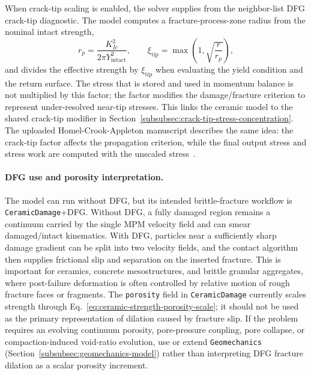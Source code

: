 When crack-tip scaling is enabled, the solver supplies  from the neighbor-list DFG crack-tip diagnostic.  The model computes a fracture-process-zone radius from the nominal intact strength,
\begin{equation}
  r_p = \frac{K_{Ic}^{2}}{2\pi Y_{\text{intact}}^{2}},
  \qquad
  \xi_{\mathrm{tip}} = \max\left(1,\sqrt{\frac{r}{r_p}}\right),
  \label{eq:ceramic-crack-tip-factor}
\end{equation}
and divides the effective strength by \(\xi_{\mathrm{tip}}\) when evaluating the yield condition and the return surface.  The stress that is stored and used in momentum balance is not multiplied by this factor; the factor modifies the damage/fracture criterion to represent under-resolved near-tip stresses.  This links the ceramic model to the shared crack-tip modifier in Section~\ref{subsubsec:crack-tip-stress-concentration}.  The uploaded Homel-Crook-Appleton manuscript describes the same idea: the crack-tip factor affects the propagation criterion, while the final output stress and stress work are computed with the unscaled stress~\cite{homelCrookAppleton2026sizeeffects}.

\paragraph{DFG use and porosity interpretation.}
The model can run without DFG, but its intended brittle-fracture workflow is \texttt{CeramicDamage}+DFG.  Without DFG, a fully damaged region remains a continuum carried by the single MPM velocity field and can smear damaged/intact kinematics.  With DFG, particles near a sufficiently sharp damage gradient can be split into two velocity fields, and the contact algorithm then supplies frictional slip and separation on the inserted fracture.  This is important for ceramics, concrete mesostructures, and brittle granular aggregates, where post-failure deformation is often controlled by relative motion of rough fracture faces or fragments.  The \texttt{porosity} field in \texttt{CeramicDamage} currently scales strength through Eq.~\eqref{eq:ceramic-strength-porosity-scale}; it should not be used as the primary representation of dilation caused by fracture slip.  If the problem requires an evolving continuum porosity, pore-pressure coupling, pore collapse, or compaction-induced void-ratio evolution, use or extend \texttt{Geomechanics} (Section~\ref{subsubsec:geomechanics-model}) rather than interpreting DFG fracture dilation as a scalar porosity increment.

